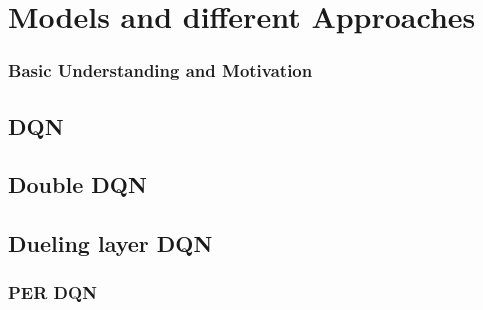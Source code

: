 \section{Models and different Approaches}
\label{sec:approach}
\subsubsection{Basic Understanding and Motivation}


\subsection{DQN}



\subsection{Double DQN}


\subsection{Dueling layer DQN}



\subsubsection{PER DQN}